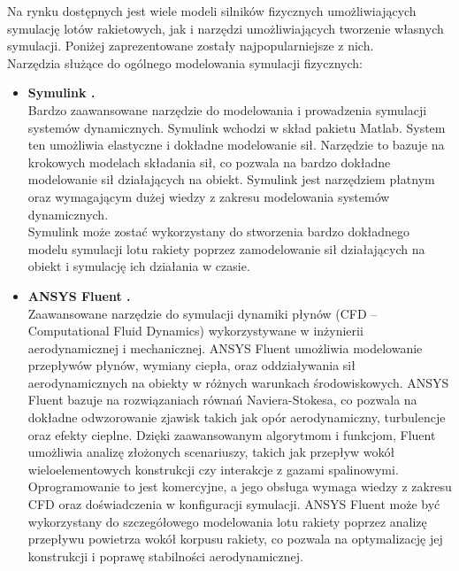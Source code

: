 Na rynku dostępnych jest wiele modeli silników fizycznych umożliwiających
symulację lotów rakietowych, jak i narzędzi umożliwiających tworzenie
własnych symulacji. Poniżej zaprezentowane zostały najpopularniejsze z nich. \\

Narzędzia służące do ogólnego modelowania symulacji fizycznych:
\begin{itemize}
    \item \textbf{Symulink \cite{matlab2019simulink}.} \\Bardzo zaawansowane
    narzędzie do
    modelowania i prowadzenia symulacji systemów dynamicznych. Symulink
    wchodzi w skład pakietu Matlab. System ten umożliwia elastyczne i
    dokładne modelowanie sił. Narzędzie to bazuje na krokowych modelach
    składania sił, co pozwala na bardzo dokładne modelowanie sił
    działających na obiekt. Symulink jest narzędziem płatnym oraz
    wymagającym dużej wiedzy z zakresu modelowania systemów dynamicznych. \\
    Symulink może zostać wykorzystany do stworzenia bardzo dokładnego modelu
    symulacji lotu rakiety poprzez zamodelowanie sił działających na
    obiekt i symulację ich działania w czasie.


    \item \textbf{ANSYS Fluent \cite{ansys2020fluent}.}
    \\Zaawansowane narzędzie do symulacji dynamiki płynów (CFD – Computational Fluid Dynamics) wykorzystywane w inżynierii aerodynamicznej i mechanicznej. ANSYS Fluent umożliwia modelowanie przepływów płynów, wymiany ciepła, oraz oddziaływania sił aerodynamicznych na obiekty w różnych warunkach środowiskowych.
    ANSYS Fluent bazuje na rozwiązaniach równań Naviera-Stokesa, co pozwala na dokładne odwzorowanie zjawisk takich jak opór aerodynamiczny, turbulencje oraz efekty cieplne. Dzięki zaawansowanym algorytmom i funkcjom, Fluent umożliwia analizę złożonych scenariuszy, takich jak przepływ wokół wieloelementowych konstrukcji czy interakcje z gazami spalinowymi.
    Oprogramowanie to jest komercyjne, a jego obsługa wymaga wiedzy z zakresu CFD oraz doświadczenia w konfiguracji symulacji.
    ANSYS Fluent może być wykorzystany do szczegółowego modelowania lotu rakiety poprzez analizę przepływu powietrza wokół korpusu rakiety, co pozwala na optymalizację jej konstrukcji i poprawę stabilności aerodynamicznej.



\end{itemize}
